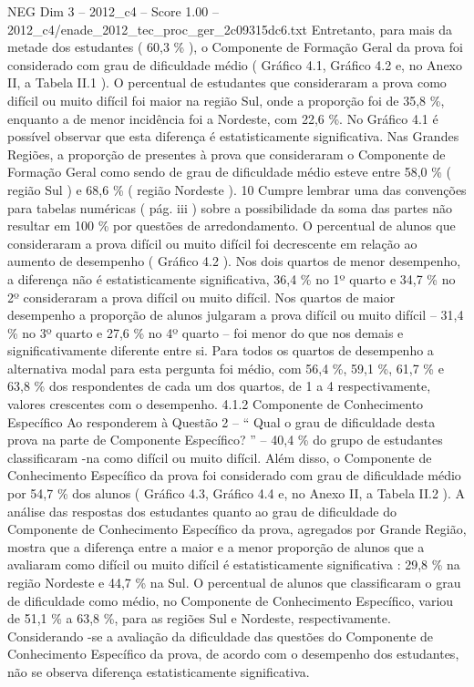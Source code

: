 \begin{textsample}{NEG Dim 3 – 2012\_c4 – Score 1.00 – 2012\_c4/enade\_2012\_tec\_proc\_ger\_2c09315dc6.txt}
Entretanto, para mais da metade dos estudantes ( 60,3 \% ), o Componente de Formação Geral da prova foi considerado com grau de dificuldade médio ( Gráfico 4.1, Gráfico 4.2 e, no Anexo II, a Tabela II.1 ).
O percentual de estudantes que consideraram a prova como difícil ou muito difícil foi maior na região Sul, onde a proporção foi de 35,8 \%, enquanto a de menor incidência foi a Nordeste, com 22,6 \%.
No Gráfico 4.1 é possível observar que esta diferença é estatisticamente significativa.
Nas Grandes Regiões, a proporção de presentes à prova que consideraram o Componente de Formação Geral como sendo de grau de dificuldade médio esteve entre 58,0 \% ( região Sul ) e 68,6 \% ( região Nordeste ). 10 Cumpre lembrar uma das convenções para tabelas numéricas ( pág. iii ) sobre a possibilidade da soma das partes não resultar em 100 \% por questões de arredondamento.
O percentual de alunos que consideraram a prova difícil ou muito difícil foi decrescente em relação ao aumento de desempenho ( Gráfico 4.2 ).
Nos dois quartos de menor desempenho, a diferença não é estatisticamente significativa, 36,4 \% no 1º quarto e 34,7 \% no 2º consideraram a prova difícil ou muito difícil.
Nos quartos de maior desempenho a proporção de alunos julgaram a prova difícil ou muito difícil – 31,4 \% no 3º quarto e 27,6 \% no 4º quarto – foi menor do que nos demais e significativamente diferente entre si.
Para todos os quartos de desempenho a alternativa modal para esta pergunta foi médio, com 56,4 \%, 59,1 \%, 61,7 \% e 63,8 \% dos respondentes de cada um dos quartos, de 1 a 4 respectivamente, valores crescentes com o desempenho. 4.1.2 Componente de Conhecimento Específico Ao responderem à Questão 2 – “ Qual o grau de dificuldade desta prova na parte de Componente Específico? ” – 40,4 \% do grupo de estudantes classificaram -na como difícil ou muito difícil.
Além disso, o Componente de Conhecimento Específico da prova foi considerado com grau de dificuldade médio por 54,7 \% dos alunos ( Gráfico 4.3, Gráfico 4.4 e, no Anexo II, a Tabela II.2 ).
A análise das respostas dos estudantes quanto ao grau de dificuldade do Componente de Conhecimento Específico da prova, agregados por Grande Região, mostra que a diferença entre a maior e a menor proporção de alunos que a avaliaram como difícil ou muito difícil é estatisticamente significativa : 29,8 \% na região Nordeste e 44,7 \% na Sul.
O percentual de alunos que classificaram o grau de dificuldade como médio, no Componente de Conhecimento Específico, variou de 51,1 \% a 63,8 \%, para as regiões Sul e Nordeste, respectivamente.
Considerando -se a avaliação da dificuldade das questões do Componente de Conhecimento Específico da prova, de acordo com o desempenho dos estudantes, não se observa diferença estatisticamente significativa.

\end{textsample}
